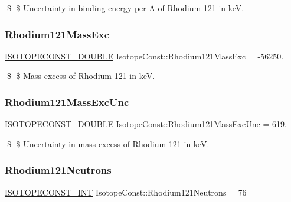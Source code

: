\$ \$ Uncertainty in binding energy per A of Rhodium-\/121 in keV. \mbox{\label{group___isotope_const-_rhodium-_rh121_gabbfec75ffb23f823a6f9a31f8a080130}} 
\subsubsection{\texorpdfstring{Rhodium121\+Mass\+Exc}{Rhodium121MassExc}}
{\footnotesize\ttfamily \mbox{\hyperlink{group___isotope_const-_macros_ga8f45a7272ce02c0b4c65c44636ed719a}{I\+S\+O\+T\+O\+P\+E\+C\+O\+N\+S\+T\+\_\+\+D\+O\+U\+B\+LE}} Isotope\+Const\+::\+Rhodium121\+Mass\+Exc = -\/56250.}

\$ \$ Mass excess of Rhodium-\/121 in keV. \mbox{\label{group___isotope_const-_rhodium-_rh121_gae3d727add4b5c76356ded403cddf50bb}} 
\subsubsection{\texorpdfstring{Rhodium121\+Mass\+Exc\+Unc}{Rhodium121MassExcUnc}}
{\footnotesize\ttfamily \mbox{\hyperlink{group___isotope_const-_macros_ga8f45a7272ce02c0b4c65c44636ed719a}{I\+S\+O\+T\+O\+P\+E\+C\+O\+N\+S\+T\+\_\+\+D\+O\+U\+B\+LE}} Isotope\+Const\+::\+Rhodium121\+Mass\+Exc\+Unc = 619.}

\$ \$ Uncertainty in mass excess of Rhodium-\/121 in keV. \mbox{\label{group___isotope_const-_rhodium-_rh121_ga236703dbd56208a035f2334c974a7f15}} 
\subsubsection{\texorpdfstring{Rhodium121\+Neutrons}{Rhodium121Neutrons}}
{\footnotesize\ttfamily \mbox{\hyperlink{group___isotope_const-_macros_ga5f18360b3e99483a35c32d789e62621c}{I\+S\+O\+T\+O\+P\+E\+C\+O\+N\+S\+T\+\_\+\+I\+NT}} Isotope\+Const\+::\+Rhodium121\+Neutrons = 76}

